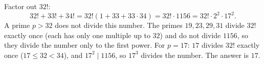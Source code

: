 Factor out $32!$:
\[32!+33!+34!=32!\left(1+33+33\cdot34\right)=32!\cdot1156=32!\cdot2^2\cdot17^2 .\]
A prime $p>32$ does not divide this number. The primes $19,23,29,31$ divide $32!$ exactly once (each has only one multiple up to $32$) and do not divide $1156$, so they divide the number only to the first power. For $p=17$: $17$ divides $32!$ exactly once ($17\le32<34$), and $17^2\mid1156$, so $17^3$ divides the number. The answer is $\boxed{17}$.

